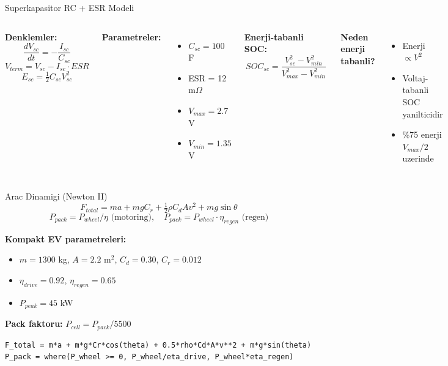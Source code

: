 \documentclass[10pt,aspectratio=169]{beamer}
\begin{document}
\begin{frame}{Superkapasitor RC + ESR Modeli}
\begin{columns}[T]
\textbf{Denklemler:}
\[ \frac{dV_{sc}}{dt} = -\frac{I_{sc}}{C_{sc}} \]
\[ V_{term} = V_{sc} - I_{sc} \cdot ESR \]
\[ E_{sc} = \tfrac{1}{2} C_{sc} V_{sc}^2 \]

\textbf{Parametreler:}
\begin{itemize}\footnotesize
  \item $C_{sc} = 100$ F
  \item ESR = 12 m$\Omega$
  \item $V_{max} = 2.7$ V
  \item $V_{min} = 1.35$ V
\end{itemize}

\textbf{Enerji-tabanli SOC:}
\[
\boxed{\,SOC_{sc} = \frac{V_{sc}^2 - V_{min}^2}{V_{max}^2 - V_{min}^2}\,}
\]

\textbf{Neden enerji tabanli?}
\begin{itemize}\footnotesize
  \item Enerji $\propto V^2$
  \item Voltaj-tabanli SOC yanilticidir
  \item \%75 enerji $V_{max}/2$ uzerinde
\end{itemize}
\end{columns}
\end{frame}

\begin{frame}[fragile]{Arac Dinamigi (Newton II)}
\[
F_{total} = m a + m g C_r + \tfrac{1}{2}\rho C_d A v^2 + m g \sin\theta
\]
\[
P_{pack} = P_{wheel}/\eta \text{ (motoring)},\quad P_{pack} = P_{wheel} \cdot \eta_{regen} \text{ (regen)}
\]

\vspace{0.3em}
\textbf{Kompakt EV parametreleri:}
\begin{itemize}\footnotesize
  \item $m = 1300$ kg, $A = 2.2$ m$^2$, $C_d = 0.30$, $C_r = 0.012$
  \item $\eta_{drive} = 0.92$, $\eta_{regen} = 0.65$
  \item $P_{peak} = 45$ kW
\end{itemize}

\textbf{Pack faktoru:} $P_{cell} = P_{pack} / 5500$

\begin{lstlisting}[style=py]
F_total = m*a + m*g*Cr*cos(theta) + 0.5*rho*Cd*A*v**2 + m*g*sin(theta)
P_pack = where(P_wheel >= 0, P_wheel/eta_drive, P_wheel*eta_regen)
\end{lstlisting}
\end{frame}
\end{document}
